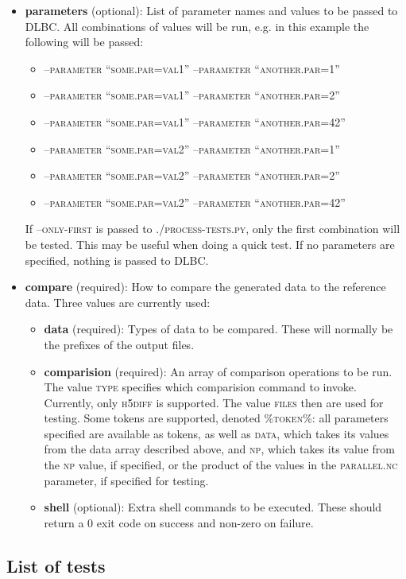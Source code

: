 \documentclass{article}
\begin{document}
\begin{itemize}
\item \textbf{parameters} (optional): List of parameter names and values to be passed to DLBC. All combinations of values will be run, e.g. in this example the following will be passed:
\begin{itemize}
\item \textsc{--parameter ``some.par=val1'' --parameter ``another.par=1''}
\item \textsc{--parameter ``some.par=val1'' --parameter ``another.par=2''}
\item \textsc{--parameter ``some.par=val1'' --parameter ``another.par=42''}
\item \textsc{--parameter ``some.par=val2'' --parameter ``another.par=1''}
\item \textsc{--parameter ``some.par=val2'' --parameter ``another.par=2''}
\item \textsc{--parameter ``some.par=val2'' --parameter ``another.par=42''}
\end{itemize}
If \textsc{--only-first} is passed to \textsc{./process-tests.py}, only the first combination will be tested. This may be useful when doing a quick test. If no parameters are specified, nothing is passed to DLBC.
\item \textbf{compare} (required): How to compare the generated data to the reference data. Three values are currently used:
\begin{itemize}
\item \textbf{data} (required): Types of data to be compared. These will normally be the prefixes of the output files.
\item \textbf{comparision} (required): An array of comparison operations to be run. The value \textsc{type} specifies which comparision command to invoke. Currently, only \textsc{h5diff} is supported. The value \textsc{files} then are used for testing. Some tokens are supported, denoted \textsc{\%token\%}: all parameters specified are available as tokens, as well as \textsc{data}, which takes its values from the data array described above, and \textsc{np}, which takes its value from the \textsc{np} value, if specified, or the product of the values in the \textsc{parallel.nc} parameter, if specified for testing.
\item \textbf{shell} (optional): Extra shell commands to be executed. These should return a 0 exit code on success and non-zero on failure.
\end{itemize}
\end{itemize}


\subsection{List of tests}


\end{document}

